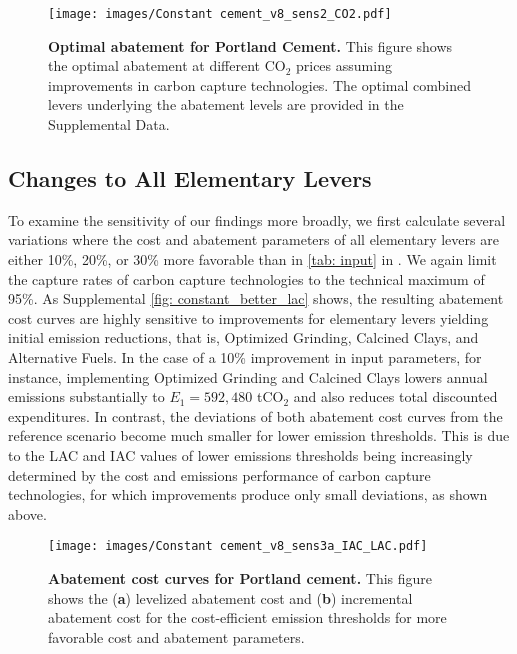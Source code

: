 \documentclass[12pt, a4paper]{article} %
\newcommand{\methods}{\nameref{sec: methods}} %
\newcommand{\Suppl}{Supplemental}
\begin{document}
\begin{figure}[ht]
\centering
\texttt{[image: images/Constant cement\_v8\_sens2\_CO2.pdf]}
\caption{\textbf{Optimal abatement for Portland Cement.} This figure shows the optimal abatement at different CO$_2$ prices assuming improvements in carbon capture technologies. The optimal combined levers underlying the abatement levels are provided in the \Suppl$ $ Data.}
\label{fig: sens2_value}
\end{figure}


\newpage
\subsection{Changes to All Elementary Levers}
\label{sec: sn-inputs}

To examine the sensitivity of our findings more broadly, we first calculate several variations where the cost and abatement parameters of all elementary levers are either 10\%, 20\%, or 30\% more favorable than in \autoref{tab: input} in \methods. We again limit the capture rates of carbon capture technologies to the technical maximum of 95\%. As \Suppl$ $ \autoref{fig: constant_better_lac} shows, the resulting abatement cost curves are highly sensitive to improvements for elementary levers yielding initial emission reductions, that is, Optimized Grinding, Calcined Clays, and Alternative Fuels. In the case of a 10\% improvement in input parameters, for instance, implementing Optimized Grinding and Calcined Clays lowers annual emissions substantially to $E_1 = 592,480$ tCO$_2$ and also reduces total discounted expenditures. In contrast, the deviations of both abatement cost curves from the reference scenario become much smaller for lower emission thresholds. This is due to the LAC and IAC values of lower emissions thresholds being increasingly determined by the cost and emissions performance of carbon capture technologies, for which improvements produce only small deviations, as shown above.

\begin{figure}[ht]
\centering
\texttt{[image: images/Constant cement\_v8\_sens3a\_IAC\_LAC.pdf]}
\caption{\textbf{Abatement cost curves for Portland cement.} This figure shows the (\textbf{a}) levelized abatement cost and (\textbf{b}) incremental abatement cost for the cost-efficient emission thresholds for more favorable cost and abatement parameters.}
\label{fig: constant_better_lac}
\end{figure}
\end{document}

